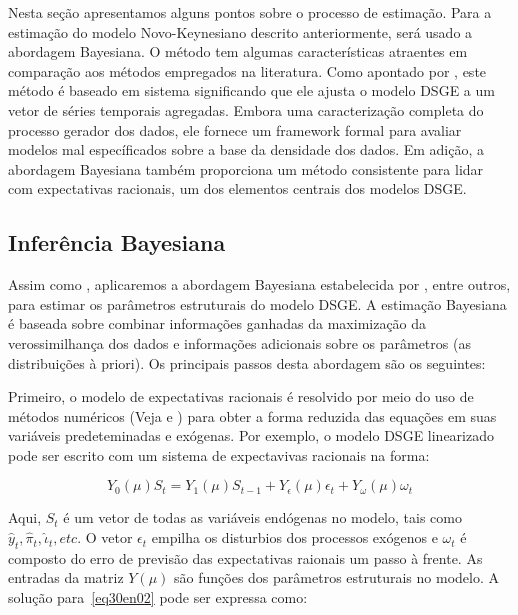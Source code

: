 \documentclass[twoside,a4paper,11pt]{report}
\begin{document}
Nesta seção apresentamos alguns pontos sobre o processo de estimação. Para a estimação do modelo Novo-Keynesiano descrito anteriormente, será usado a abordagem Bayesiana. O método tem algumas características atraentes em comparação aos métodos empregados na literatura. Como apontado por \citet{an2007bayesian}, este método é baseado em sistema significando que ele ajusta o modelo DSGE a um vetor de séries temporais agregadas. Embora uma caracterização completa do processo gerador dos dados, ele fornece um framework formal para avaliar modelos mal específicados sobre a base da densidade dos dados. Em adição, a abordagem Bayesiana também proporciona um método consistente para lidar com expectativas racionais, um dos elementos centrais dos modelos DSGE.

\subsection*{Inferência Bayesiana}

Assim como \citet{yao2010aggregate}, aplicaremos a abordagem Bayesiana estabelecida por \citet{dejong2000bayesian}, \citet{schorfheide2000loss} entre outros, para estimar os parâmetros estruturais do modelo DSGE. A estimação Bayesiana é baseada sobre combinar informações ganhadas da maximização da verossimilhança dos dados e informações adicionais sobre os parâmetros (as distribuições à priori). Os principais passos desta abordagem são os seguintes:

Primeiro, o modelo de expectativas racionais é resolvido por meio do uso de métodos numéricos (Veja \citet{sims2002solving} e \citet{uhlig1998toolkit}) para obter a forma reduzida das equações em suas variáveis predeteminadas e exógenas. Por exemplo, o modelo DSGE linearizado pode ser escrito com um sistema de expectavivas racionais na forma:

\begin{equation}\label{eq30en02}
{Y}_{0}(\mu){S}_{t}={Y}_{1}(\mu){S}_{t-1}+{Y}_{\epsilon}(\mu){\epsilon_{t}}+{Y}_{\omega  }(\mu) {\omega}_{t}
\end{equation}

Aqui, ${S}_{t}$ é um vetor de todas as variáveis endógenas no modelo, tais como ${\hat{y}}_{t},{\hat{\pi}}_{t},{\hat{\iota}}_{t}, etc$. O vetor ${\epsilon_{t}}$ empilha os disturbios dos processos exógenos e ${\omega}_{t}$ é composto do erro de previsão das expectativas raionais um passo à frente. As entradas da matriz ${Y}(\mu)$ são funções dos parâmetros estruturais no modelo. A solução para~\ref{eq30en02} pode ser expressa como:
\end{document}
